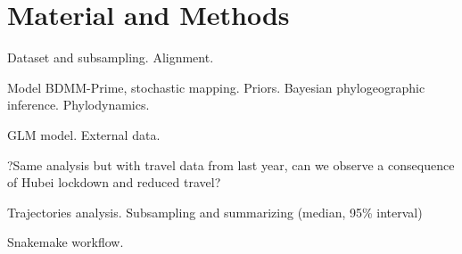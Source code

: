 \documentclass[12pt,]{article}
\begin{document}
\section*{Material and Methods}

\item Dataset and subsampling. Alignment. 

\item Model BDMM-Prime, stochastic mapping. Priors. Bayesian phylogeographic inference. Phylodynamics.

\item GLM model. External data.

\item ?Same analysis but with travel data from last year, can we observe a consequence of Hubei lockdown and reduced travel?

\item Trajectories analysis. Subsampling and summarizing (median, 95\% interval)

\item Snakemake workflow.
\end{document}
